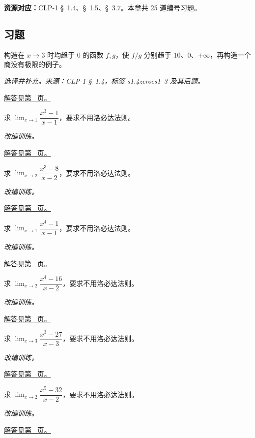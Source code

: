 \documentclass[12pt,fontset=fandol]{ctexart}
\begin{document}
\textbf{资源对应：}CLP-1 \S~1.4、\S~1.5、\S~3.7。本章共 25 道编号习题。
\subsection{习题}
\begin{example}[零比零不能直接运算]\label{ex:c3q1}
构造在 $x\to3$ 时均趋于 $0$ 的函数 $f,g$，使 $f/g$ 分别趋于 $10$、$0$、$+\infty$，再构造一个商没有极限的例子。
\par\textit{选译并补充。来源：CLP-1 \S~1.4，标签 s1.4zeroes1--3 及其后题。}\par\hyperref[ans:c3q1]{解答见第~\pageref{ans:c3q1} 页。}
\end{example}
\begin{example}[差幂因式分解]\label{ex:c3q2}
求 $\displaystyle\lim_{x\to 1}\dfrac{x^{3}-1}{x-1}$，要求不用洛必达法则。
\par\textit{改编训练。}\par\hyperref[ans:c3q2]{解答见第~\pageref{ans:c3q2} 页。}
\end{example}
\begin{example}[差幂因式分解]\label{ex:c3q3}
求 $\displaystyle\lim_{x\to 2}\dfrac{x^{3}-8}{x-2}$，要求不用洛必达法则。
\par\textit{改编训练。}\par\hyperref[ans:c3q3]{解答见第~\pageref{ans:c3q3} 页。}
\end{example}
\begin{example}[差幂因式分解]\label{ex:c3q4}
求 $\displaystyle\lim_{x\to 1}\dfrac{x^{4}-1}{x-1}$，要求不用洛必达法则。
\par\textit{改编训练。}\par\hyperref[ans:c3q4]{解答见第~\pageref{ans:c3q4} 页。}
\end{example}
\begin{example}[差幂因式分解]\label{ex:c3q5}
求 $\displaystyle\lim_{x\to 2}\dfrac{x^{4}-16}{x-2}$，要求不用洛必达法则。
\par\textit{改编训练。}\par\hyperref[ans:c3q5]{解答见第~\pageref{ans:c3q5} 页。}
\end{example}
\begin{example}[差幂因式分解]\label{ex:c3q6}
求 $\displaystyle\lim_{x\to 3}\dfrac{x^{3}-27}{x-3}$，要求不用洛必达法则。
\par\textit{改编训练。}\par\hyperref[ans:c3q6]{解答见第~\pageref{ans:c3q6} 页。}
\end{example}
\begin{example}[差幂因式分解]\label{ex:c3q7}
求 $\displaystyle\lim_{x\to 2}\dfrac{x^{5}-32}{x-2}$，要求不用洛必达法则。
\par\textit{改编训练。}\par\hyperref[ans:c3q7]{解答见第~\pageref{ans:c3q7} 页。}
\end{example}
\end{document}
